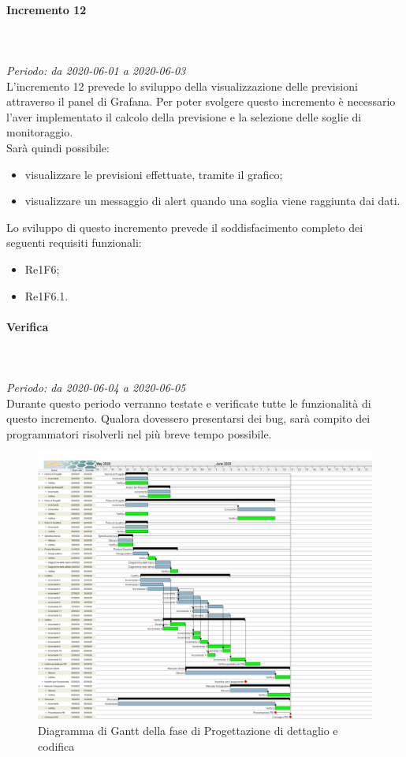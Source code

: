 \paragraph{Incremento 12}\mbox{} \\ \mbox{} \\ 
\textit{Periodo: da 2020-06-01 a 2020-06-03}\\
L’incremento 12 prevede lo sviluppo della visualizzazione delle previsioni attraverso il panel di Grafana. Per poter svolgere questo incremento è necessario l'aver implementato il calcolo della previsione e la selezione delle soglie di monitoraggio. \\
Sarà quindi possibile:
\begin{itemize}
	\item visualizzare le previsioni effettuate, tramite il grafico;
	\item visualizzare un messaggio di alert quando una soglia viene raggiunta dai dati.
\end{itemize}
Lo sviluppo di questo incremento prevede il soddisfacimento completo dei seguenti requisiti funzionali:
\begin{itemize}
\item Re1F6;
\item Re1F6.1.
\end{itemize}
\paragraph*{Verifica}\mbox{} \\ \mbox{} \\ 
\textit{Periodo: da 2020-06-04 a 2020-06-05}\\
Durante questo periodo verranno testate e verificate tutte le funzionalità di questo incremento. Qualora dovessero presentarsi dei bug, sarà compito dei programmatori risolverli nel più breve tempo possibile.

\begin{figure}[H]
\centering
\includegraphics[scale=0.24]{./img/gantt/progettazione_dettaglio_codifica.png}
\caption{Diagramma di Gantt della fase di Progettazione di dettaglio e codifica}
\end{figure}

